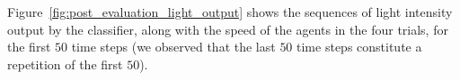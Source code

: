 Figure~\ref{fig:post_evaluation_light_output} shows the sequences of light intensity output by the classifier, along with the speed of the agents in the four trials, for the first $50$ time steps (we observed that the last $50$ time steps constitute a repetition of the first $50$).
